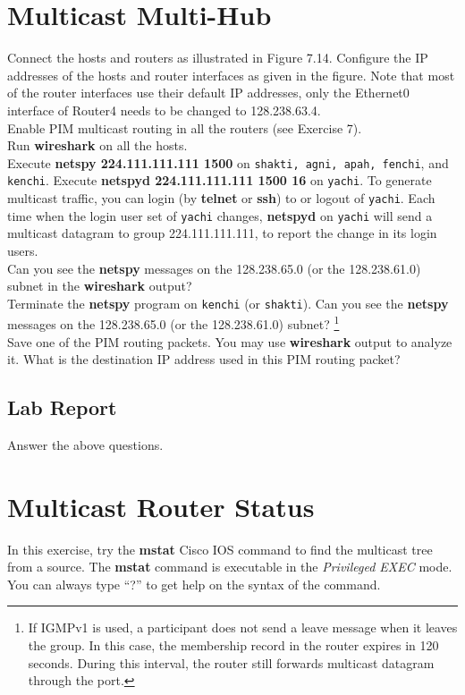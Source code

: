 \documentclass[10pt,a4paper]{article}
\numberwithin{equation}{section}
\numberwithin{figure}{section}
\numberwithin{table}{section}
\begin{document}
    \section{Multicast Multi-Hub}
    Connect the hosts and routers as illustrated in Figure 7.14.
    Configure the IP addresses of the hosts and router interfaces as given in the figure.
    Note that most of the router interfaces use their default IP addresses, only the Ethernet0 interface of Router4 needs to be changed to 128.238.63.4. \\
    Enable PIM multicast routing in all the routers (see Exercise 7). \\
    Run \textbf{wireshark} on all the hosts. \\
    Execute \textbf{netspy 224.111.111.111 1500} on \texttt{shakti, agni, apah, fenchi}, and \texttt{kenchi}.
    Execute \textbf{netspyd 224.111.111.111 1500 16} on \texttt{yachi}.
    To generate multicast traffic, you can login (by \textbf{telnet} or \textbf{ssh}) to or logout of \texttt{yachi}.
    Each time when the login user set of \texttt{yachi} changes, \textbf{netspyd} on \texttt{yachi} will send a multicast datagram to group 224.111.111.111, to report the change in its login users. \\
    Can you see the \textbf{netspy} messages on the 128.238.65.0 (or the 128.238.61.0) subnet in the \textbf{wireshark} output? \\
    Terminate the \textbf{netspy} program on \texttt{kenchi} (or \texttt{shakti}).
    Can you see the \textbf{netspy} messages on the 128.238.65.0 (or the 128.238.61.0) subnet?
    \footnote{If IGMPv1 is used, a participant does not send a leave message when it leaves the group.
    In this case, the membership record in the router expires in 120 seconds.
    During this interval, the router still forwards multicast datagram through the port.} \\
    Save one of the PIM routing packets.
    You may use \textbf{wireshark} output to analyze it.
    What is the destination IP address used in this PIM routing packet?
    \subsection*{Lab Report}
    Answer the above questions.

    \section{Multicast Router Status}
    In this exercise, try the \textbf{mstat} Cisco IOS command to find the multicast tree from a source.
    The \textbf{mstat} command is executable in the \textit{Privileged EXEC} mode.
    You can always type “?” to get help on the syntax of the command.
\end{document}

